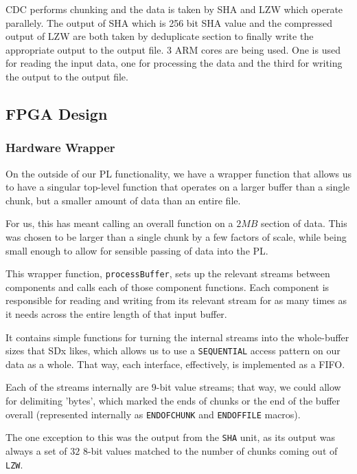 \documentclass{article}
\begin{document}
CDC performs chunking and the data is taken by SHA and LZW which operate parallely. The output of SHA which is 256 bit SHA value and the compressed output of LZW are both taken by deduplicate section to finally write the appropriate output to the output file. 
3 ARM cores are being used. One is used for reading the input data, one for processing the data and the third for writing the output to the output file.  

\subsection{FPGA Design}


\subsubsection{Hardware Wrapper}

On the outside of our PL functionality, we have a wrapper function that allows us to have a singular top-level function that operates on a larger buffer than a single chunk, but a smaller amount of data than an entire file.
\par
For us, this has meant calling an overall function on a $2{MB}$ section of data. This was chosen to be larger than a single chunk by a few factors of scale, while being small enough to allow for sensible passing of data into the PL.
\newline\par
This wrapper function, \texttt{processBuffer}, sets up the relevant streams between components and calls each of those component functions. 
Each component is responsible for reading and writing from its relevant stream for as many times as it needs across the entire length of that input buffer.
\par
It contains simple functions for turning the internal streams into the whole-buffer sizes that SDx likes, which allows us to use a \texttt{SEQUENTIAL} access pattern on our data as a whole. That way, each interface, effectively, is implemented as a FIFO.
\newline\par
Each of the streams internally are $9$-bit value streams; that way, we could allow for delimiting 'bytes', which marked the ends of chunks or the end of the buffer overall (represented internally as \texttt{ENDOFCHUNK} and \texttt{ENDOFFILE} macros).
\par
The one exception to this was the output from the \texttt{SHA} unit, as its output was always a set of $32$ 8-bit values matched to the number of chunks coming out of \texttt{LZW}.
\end{document}
